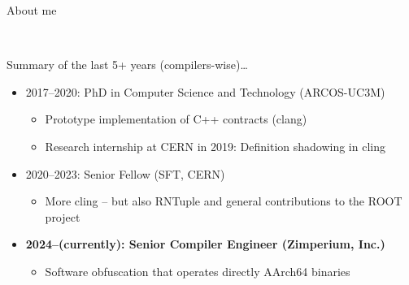 \begin{frame}{About me}
  \begin{center}
    \\
  \end{center}

  \vfill
  Summary of the last 5+ years (compilers-wise)\ldots{}
  \begin{itemize}
  \item 2017--2020: PhD in Computer Science and Technology (ARCOS-UC3M)
    \begin{itemize}
    \item Prototype implementation of C++ contracts (clang)
    \item Research internship at CERN in 2019: Definition shadowing in cling
    \end{itemize}
    \medskip

  \item 2020--2023: Senior Fellow (SFT, CERN)
    \begin{itemize}
    \item More cling -- but also RNTuple and general contributions to the ROOT project
    \end{itemize}
    \medskip

  \item \textbf{2024--(currently): Senior Compiler Engineer (Zimperium, Inc.)}
    \begin{itemize}
    \item Software obfuscation that operates directly AArch64 binaries
    \end{itemize}
  \end{itemize}
\end{frame}
